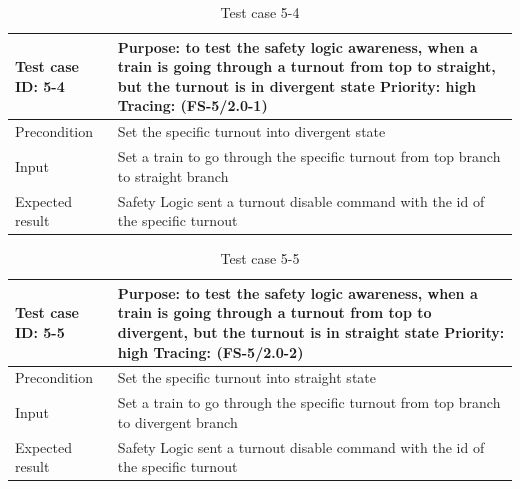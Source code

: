 \begin{table}[H]
	\caption{Test case 5-4}
	\label{table:TCase-FS5-4}
	\begin{center}
		\renewcommand{\arraystretch}{1.8}
		\begin{tabu} 
			to 0.9 \textwidth
			{  X[0.4, c] X[c] }
			\toprule
			Test case ID: 5-4 & Purpose: to test the safety logic awareness, when a train is going through a turnout from top to straight, but the turnout is in divergent state \newline Priority: high \newline Tracing: (FS-5/2.0-1)\\ \midrule
			Precondition & Set the specific turnout into divergent state  \\
			Input & Set a train to go through the specific turnout from top branch to straight branch \\
			Expected result & Safety Logic sent a turnout disable command with the id of the specific turnout \\ \bottomrule
		\end{tabu}
	\end{center}
\end{table} 



\begin{table}[H]
	\caption{Test case 5-5}
	\label{table:TCase-FS5-5}
	\begin{center}
		\renewcommand{\arraystretch}{1.8}
		\begin{tabu} 
			to 0.9 \textwidth
			{  X[0.4, c] X[c] }
			\toprule
			Test case ID: 5-5 & Purpose: to test the safety logic awareness, when a train is going through a turnout from top to divergent, but the turnout is in straight state \newline Priority: high \newline Tracing: (FS-5/2.0-2)\\ \midrule
			Precondition & Set the specific turnout into straight state  \\
			Input & Set a train to go through the specific turnout from top branch to divergent branch \\
			Expected result & Safety Logic sent a turnout disable command with the id of the specific turnout \\ \bottomrule
		\end{tabu}
	\end{center}
\end{table} 

